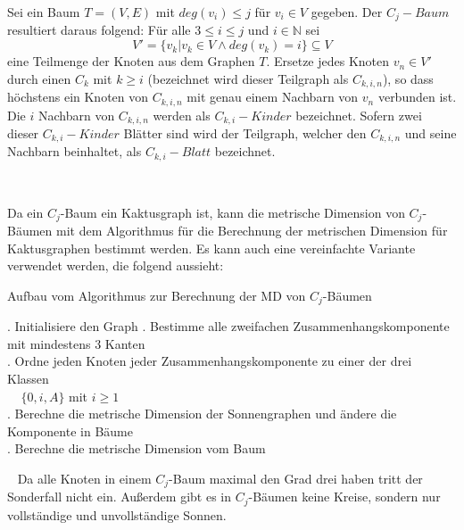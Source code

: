\begin{defi}
Sei ein Baum $T=(V,E)$ mit $deg(v_i)\leq j$ für $v_i \in V$ gegeben. Der $C_j-Baum$ resultiert daraus folgend: 
Für alle $3 \leq i \leq j$ und $i \in \mathbb{N}$ sei $$V'=\{v_k|v_k \in V \wedge deg(v_k)=i\}\subseteq V$$ eine Teilmenge der Knoten aus dem Graphen $T$. Ersetze jedes Knoten $v_n \in V'$ durch einen $C_k$ mit $k \geq i$ (bezeichnet wird dieser Teilgraph als \emph{$C_{k,i,n}$}), so dass höchstens ein Knoten von $C_{k,i,n}$ mit genau einem Nachbarn von $v_n$ verbunden ist. Die $i$ Nachbarn von $C_{k,i,n}$ werden als \emph{$C_{k,i}-Kinder$} bezeichnet. Sofern zwei dieser $C_{k,i}-Kinder$ Blätter sind wird der Teilgraph, welcher den $C_{k,i,n}$ und seine Nachbarn beinhaltet, als \emph{$C_{k,i}-Blatt$} bezeichnet.
\end{defi}

\begin{bsp}~\newline

\end{bsp}

\begin{bem}
Da ein $C_j$-Baum ein Kaktusgraph ist, kann die metrische Dimension von $C_j$-Bäumen mit dem Algorithmus für die Berechnung der metrischen Dimension für Kaktusgraphen bestimmt werden. Es kann auch eine vereinfachte Variante verwendet werden, die folgend aussieht:\newline
\begin{algorithm}
\caption{Aufbau vom Algorithmus zur Berechnung der MD von $C_j$-Bäumen}
\begin{algorithmic}
\vspace{2mm}
. Initialisiere den Graph
\vspace{2mm}
. Bestimme alle zweifachen Zusammenhangskomponente mit mindestens 3 Kanten\\
\vspace{2mm}
. Ordne jeden Knoten jeder Zusammenhangskomponente zu einer der drei Klassen\\$\;\;\;\;\{0,i,A\}$ mit $i \geq 1$\\
\vspace{2mm}
. Berechne die metrische Dimension der Sonnengraphen und ändere die Komponente in Bäume\\
\vspace{2mm}
. Berechne die metrische Dimension vom Baum
\vspace{2mm}
\end{algorithmic}
\end{algorithm}
~\linebreak
Da alle Knoten in einem $C_j$-Baum maximal den Grad drei haben tritt der Sonderfall nicht ein. Außerdem gibt es in $C_j$-Bäumen keine Kreise, sondern nur vollständige und unvollständige Sonnen.

\end{bem}
